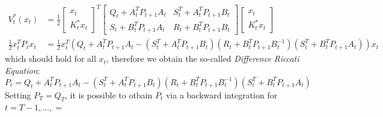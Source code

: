 \documentclass[openany]{book}
\theoremstyle{definition}
\theoremstyle{remark}
\begin{document}
\begin{align*}
    V_t^*(x_t) &= \frac{1}{2} \begin{bmatrix}
        x_t \\ K_t^* x_t
    \end{bmatrix}^T \begin{bmatrix}
        Q_t+A_t^T P_{t+1} A_t & S_t^T + A_t^T P_{t+1} B_t\\ 
        S_t + B_t^T P_{t+1} A_t & R_t + B_t^T P_{t+1} B_t
    \end{bmatrix} \begin{bmatrix}
        x_t \\ K_t^* x_t
    \end{bmatrix} \\
    \displaystyle\frac{1}{2}x_t^TP_tx_t&= \displaystyle\frac{1}{2}x_t^T\left(Q_t +A_t^TP_{t+1}A_t-(S_t^T+A_t^TP_{t+1}B_t)(R_t+B_t^TP_{t+1}B_t^{-1})(S_t^T+B_t^TP_{t+1}A_t)\right)x_t
\end{align*}
which should hold for all $x_t$, therefore we obtain the so-called \emph{Difference Riccati Equation}:
\[
    P_t = Q_t +A_t^TP_{t+1}A_t-(S_t^T+A_t^TP_{t+1}B_t)(R_t+B_t^TP_{t+1}B_t^{-1})(S_t^T+B_t^TP_{t+1}A_t)
\]
Setting $P_T=Q_T$, it is possible to otbain $P_t$ via a backward integration for $t=T-1,\dots,=$
\end{document}
